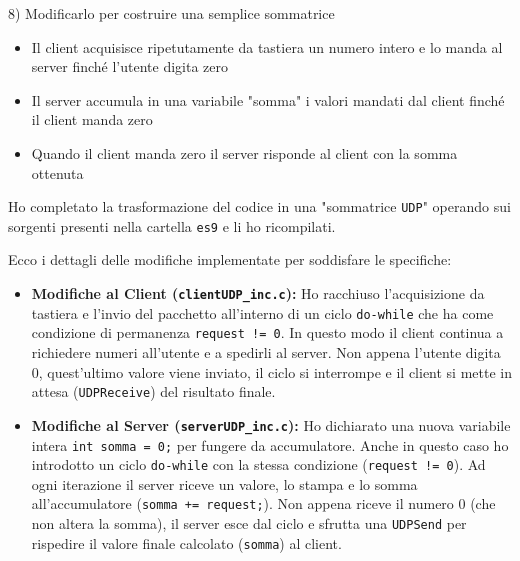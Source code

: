 \documentclass[11pt]{article}
\begin{document}
\begin{tcolorbox}[colback=blue!5!white,colframe=blue!75!black,title=\textbf{DOMANDA}, breakable]
8) Modificarlo per costruire una semplice sommatrice
\begin{itemize}
    \item Il client acquisisce ripetutamente da tastiera un numero intero e lo manda al server finché l'utente digita zero
    \item Il server accumula in una variabile "somma" i valori mandati dal client finché il client manda zero
    \item Quando il client manda zero il server risponde al client con la somma ottenuta
\end{itemize}
\end{tcolorbox}

\begin{tcolorbox}[colback=green!5!white,colframe=green!75!black,title=\textbf{RISPOSTA}, breakable]
Ho completato la trasformazione del codice in una "sommatrice \texttt{UDP}" operando sui sorgenti presenti nella cartella \texttt{es9} e li ho ricompilati.

Ecco i dettagli delle modifiche implementate per soddisfare le specifiche:

\begin{itemize}
    \item \textbf{Modifiche al Client (\texttt{clientUDP\_inc.c}):} Ho racchiuso l'acquisizione da tastiera e l'invio del pacchetto all'interno di un ciclo \texttt{do-while} che ha come condizione di permanenza \texttt{request != 0}. In questo modo il client continua a richiedere numeri all'utente e a spedirli al server. Non appena l'utente digita 0, quest'ultimo valore viene inviato, il ciclo si interrompe e il client si mette in attesa (\texttt{UDPReceive}) del risultato finale.
    
    \item \textbf{Modifiche al Server (\texttt{serverUDP\_inc.c}):} Ho dichiarato una nuova variabile intera \texttt{int somma = 0;} per fungere da accumulatore. Anche in questo caso ho introdotto un ciclo \texttt{do-while} con la stessa condizione (\texttt{request != 0}). Ad ogni iterazione il server riceve un valore, lo stampa e lo somma all'accumulatore (\texttt{somma += request;}). Non appena riceve il numero 0 (che non altera la somma), il server esce dal ciclo e sfrutta una \texttt{UDPSend} per rispedire il valore finale calcolato (\texttt{somma}) al client.
\end{itemize}
\end{tcolorbox}
\end{document}
